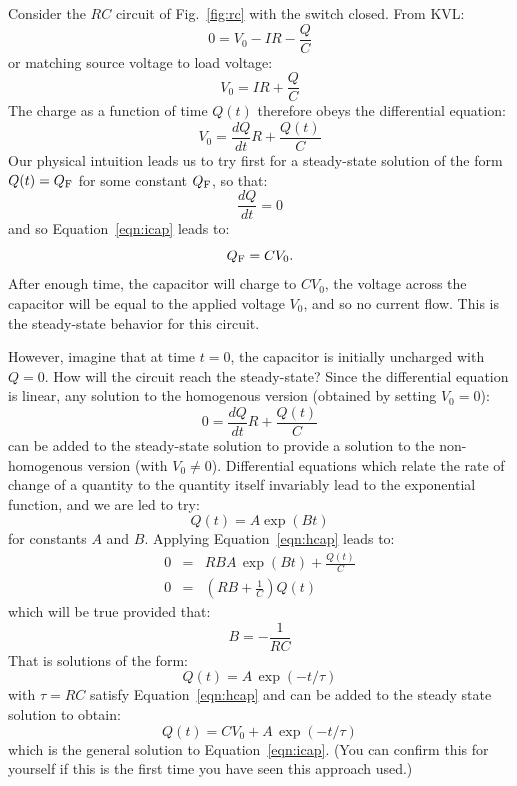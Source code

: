 \documentclass[12pt,oneside]{book}
\begin{document}
Consider the $RC$ circuit of Fig.~\ref{fig:rc} with the switch closed.  From KVL:
\begin{displaymath}
0 = V_0 - IR - \frac{Q}{C}
\end{displaymath}
or matching source voltage to load voltage:
\begin{displaymath}
V_0 = IR + \frac{Q}{C}
\end{displaymath}
The charge as a function of time $Q(t)$ therefore obeys the differential equation:
\begin{equation} \label{eqn:icap}
V_0 = \frac{dQ}{dt}R + \frac{Q(t)}{C}
\end{equation}
Our physical intuition leads us to try first for a steady-state solution of the form $Q(t) = Q_{\rm F}$ for some constant $Q_{\rm F}$, so that:
\begin{displaymath}
\frac{dQ}{dt} = 0
\end{displaymath}
and so Equation~\ref{eqn:icap} leads to:
\begin{displaymath}
Q_{\rm F} = C V_0.
\end{displaymath}
After enough time, the capacitor will charge to $CV_0$, the voltage across the capacitor will be equal to the applied voltage $V_0$, and so no current flow.  This is the steady-state behavior for this circuit.

However, imagine that at time $t=0$, the capacitor is initially uncharged with $Q=0$.  How will the circuit reach the steady-state?  Since the differential equation is linear, any solution to the homogenous version  (obtained by setting $V_0=0$):
\begin{equation} \label{eqn:hcap}
0 = \frac{dQ}{dt}R + \frac{Q(t)}{C}
\end{equation}
can be added to the steady-state solution to provide a solution to the non-homogenous version (with $V_0 \ne 0$).  Differential equations which relate the rate of change of a quantity to the quantity itself invariably lead to the exponential function, and we are led to try:
\begin{displaymath}
Q(t) = A \exp(B t)
\end{displaymath}
for constants $A$ and $B$.  Applying Equation~\ref{eqn:hcap} leads to:
\begin{eqnarray*}
0 &=& R B A \, \exp(B t)  + \frac{Q(t)}{C}\\
0 &=& \left( RB + \frac{1}{C}\right) Q(t)
\end{eqnarray*}
which will be true provided that:
\begin{displaymath}
B = -\frac{1}{RC}
\end{displaymath}
That is solutions of the form:
\begin{displaymath}
Q(t) = A \, \exp(- t/\tau)
\end{displaymath}
with $\tau = RC$ satisfy Equation~\ref{eqn:hcap} and can be added to the steady state solution to obtain:
\begin{displaymath}
Q(t) = CV_0 + A \, \exp(- t / \tau)
\end{displaymath}
which is the general solution to Equation~\ref{eqn:icap}.  (You can confirm this for yourself if this is the first time you have seen this approach used.)
\end{document}
